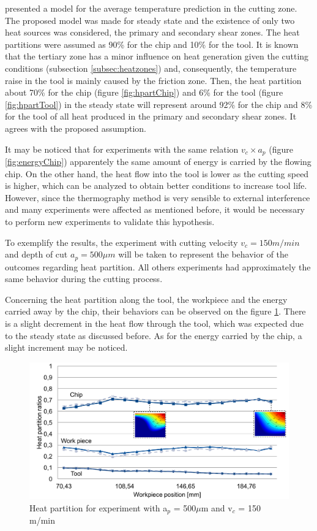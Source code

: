 		 presented a model for the average temperature prediction in the cutting zone. The proposed model was made for steady state and the existence of only two heat sources was considered, the primary and secondary shear zones. The heat partitions were assumed as 90\% for the chip and 10\% for the tool. It is known that the tertiary zone has a minor influence on heat generation given the cutting conditions (subsection \ref{subsec:heatzones}) and, consequently, the temperature raise in the tool is mainly caused by the friction zone. Then, the heat partition about 70\% for the chip (figure \ref{fig:hpartChip}) and 6\% for the tool (figure \ref{fig:hpartTool}) in the steady state will represent around 92\% for the chip and 8\% for the tool of all heat produced in the primary and secondary shear zones. It agrees with the proposed assumption.

		It may be noticed that for experiments with the same relation $v_{c}\times a_{p}$ (figure \ref{fig:energyChip}) apparentely the same amount of energy is carried by the flowing chip. On the other hand, the heat flow into the tool is lower as the cutting speed is higher, which can be analyzed to obtain better conditions to increase tool life. However, since the thermography method is very sensible to external interference and many experiments were affected as mentioned before, it would be necessary to perform new experiments to validate this hypothesis.

		To exemplify the results, the experiment with cutting velocity $v_{c} = 150 m/min$ and depth of cut $a_{p} = 500 \mu m$ will be taken to represent the behavior of the outcomes regarding heat partition. All others experiments had approximately the same behavior during the cutting process.

		Concerning the heat partition along the tool, the workpiece and the energy carried away by the chip, their behaviors can be observed on the figure \ref{fig:hpartExp}. There is a slight decrement in the heat flow through the tool, which was expected due to the steady state as discussed before. As for the energy carried by the chip, a slight increment may be noticed.

		\begin{figure}[H]
			\centering
			\captionsetup{justification=centering}
			\includegraphics[scale=0.55]{Imagens/partition500150.png}
			\caption{Heat partition for experiment with a$_{p}$ = 500$\mu$m and v$_{c}$ = 150 m/min}
			\label{fig:hpartExp}
		\end{figure}